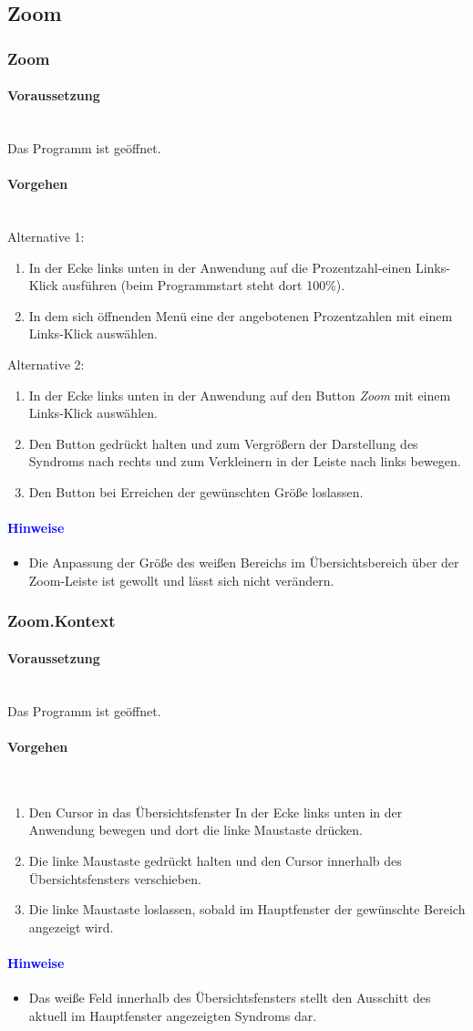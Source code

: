 \documentclass[enabledeprecatedfontcommands,fontsize=11pt,paper=a4,twoside]{scrartcl}
\newcommand*{\hint}{\paragraph{\textcolor{blue}{Hinweise}}}
\newcommand*{\condition}{\paragraph{Voraussetzung}$\;$ \vspace{0.2cm}\\}
\newcommand*{\actions}{\paragraph{Vorgehen} $\;$\vspace{0.2cm}\\}
\begin{document}
				\newpage
	\subsection{Zoom} \label{zoom}
		\subsubsection{Zoom}
		\condition 	
		Das Programm ist geöffnet.
		\actions
		Alternative 1:
		\begin{enumerate}
				\item In der Ecke links unten in der Anwendung auf die Prozentzahl-einen Links-Klick ausführen (beim Programmstart steht dort 100\%). 
				\item In dem sich öffnenden Menü eine der angebotenen Prozentzahlen mit einem Links-Klick auswählen.
		\end{enumerate}
		Alternative 2:
		\begin{enumerate}
			\item In der Ecke links unten in der Anwendung auf den Button \textit{Zoom} mit einem Links-Klick auswählen.
			\item Den Button gedrückt halten und zum Vergrößern der Darstellung des Syndroms nach rechts und zum Verkleinern in der Leiste nach links bewegen.
			\item Den Button bei Erreichen der gewünschten Größe loslassen.
		\end{enumerate}
		\hint
		\begin{itemize}
				\item Die Anpassung der Größe des weißen Bereichs im Übersichtsbereich über der Zoom-Leiste ist gewollt und lässt sich nicht verändern.
	 	\end{itemize}		
		
							\newpage
		\subsubsection{Zoom.Kontext}
		\condition 	
		Das Programm ist geöffnet.
		\actions
		\begin{enumerate}
				\item Den Cursor in das Übersichtsfenster In der Ecke links unten in der Anwendung bewegen und dort die linke Maustaste drücken.
				\item Die linke Maustaste gedrückt halten und den Cursor innerhalb des Übersichtsfensters verschieben.
				\item Die linke Maustaste loslassen, sobald im Hauptfenster der gewünschte Bereich angezeigt wird.
		\end{enumerate}
		\hint
		\begin{itemize}
				\item Das weiße Feld innerhalb des Übersichtsfensters stellt den Ausschitt des aktuell im Hauptfenster angezeigten Syndroms dar.
	 	\end{itemize}			
		
\end{document}
